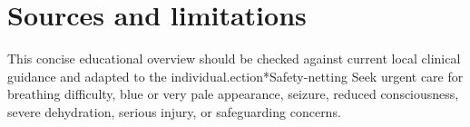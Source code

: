\section*{Sources and limitations}
This concise educational overview should be checked against current local clinical guidance and adapted to the individual.ection*{Safety-netting}
Seek urgent care for breathing difficulty, blue or very pale appearance, seizure, reduced consciousness, severe dehydration, serious injury, or safeguarding concerns.
